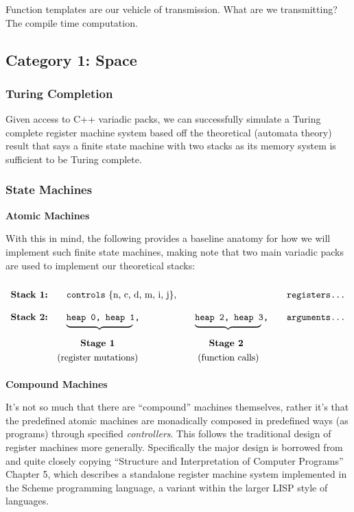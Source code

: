 \documentclass[twoside]{article}
\newcommand{\strong}[1]{{\bfseries #1}}
\newcommand{\bfmbox}[1]{\mbox{\bfseries #1}}
\newcommand{\tab}[1][1.125cm]{\hspace{#1}}
\newcommand{\col}[1][0ex]{& \hspace{#1}}
\begin{document}
Function templates are our vehicle of transmission. What are we transmitting? The compile time computation.

\subsection*{Category 1: Space}

\subsubsection*{Turing Completion}

Given access to C++ variadic packs, we can successfully simulate a Turing complete register machine system based off the
theoretical (automata theory) result that says a finite state machine with two stacks as its memory system is sufficient
to be Turing complete.

\subsubsection*{State Machines}

\strong{Atomic Machines}

With this in mind, the following provides a baseline anatomy for how we will implement such finite
state machines, making note that two main variadic packs are used to implement our theoretical stacks:

$$ \def\arraystretch{2}
\tab[0cm] \begin{array}{llll}
\bfmbox{Stack 1:} \col[1em]   \texttt{controls}\mbox{ \{n, c, d, m, i, j\},}             \col\col[1em] \texttt{registers\ldots} \\
\bfmbox{Stack 2:} \col[1em]   \texttt{heap 0, heap 1,}  \col[1em]   \texttt{heap 2, heap 3,} \col[1em] \texttt{arguments\ldots} \\[-2em]
		  \col[1em]   \underbrace{\tab[2.5cm]}  \col[1em]   \underbrace{\tab[2.5cm]}                                    \\
		  \col[2.5em] \bfmbox{Stage 1}          \col[2.5em] \bfmbox{Stage 2}                                            \\[-2ex]
		  \col      \mbox{(register mutations)} \col[3ex] \mbox{(function calls)}
\end{array} $$

\strong{Compound Machines}

It's not so much that there are ``compound'' machines themselves, rather it's that the predefined atomic machines
are monadically composed in predefined ways (as programs) through specified \emph{controllers}. This follows the
traditional design of register machines more generally. Specifically the major design is borrowed from and quite
closely copying ``Structure and Interpretation of Computer Programs'' Chapter 5, which describes a standalone register
machine system implemented in the Scheme programming language, a variant within the larger LISP style of languages.
\end{document}
